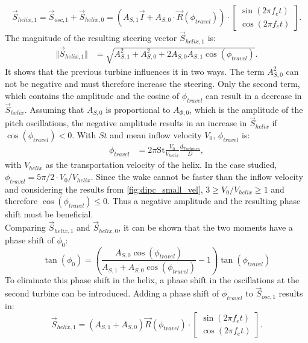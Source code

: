 \begin{equation}
	\vec{S}_{helix,1} = \vec{S}_{osc,1} + \vec{S}_{helix,0} = \left(A_{S,1} \vec{I} + A_{S,0} \cdot \vec{R}(\phi_{travel})\right) 
	\cdot 
	\begin{bmatrix}
	\sin(2\pi f_e t) \\
	\cos(2\pi f_e t)
	\end{bmatrix} .
\end{equation}
The magnitude of the resulting steering vector $\vec{S}_{helix,1}$ is:
\begin{align}
	\Vert\vec{S}_{helix,1}\Vert &= \sqrt{A_{S,1}^2 + A_{S,0}^2 + 2 A_{S,0} A_{S,1} \cos(\phi_{travel})}  \label{eq:helix_moment}.
\end{align}
It shows that the previous turbine influences it in two ways. The term $A_{S,0}^2$ can not be negative and must therefore increase the steering. Only the second term, which contains the amplitude and the cosine of $\phi_{travel}$ can result in a decrease in $\vec{S}_{helix}$. Assuming that $A_{S,0}$ is proportional to $A_{\Phi,0}$, which is the amplitude of the pitch oscillations, the negative amplitude results in an increase in $\vec{S}_{helix}$ if $\cos(\phi_{travel}) < 0$. With $St$ and mean inflow velocity $V_0$, $\phi_{travel}$ is:
\begin{align}
	\phi_{travel} & = 2 \pi \mathrm{St} \frac{V_0}{V_{helix}} \frac{d_{Turbines}}{D} \label{eq:phi_travel},
\end{align} 
with $V_{helix}$ as the transportation velocity of the helix. In the case studied, $\phi_{travel} = 5\pi/2 \cdot V_0 / V_{helix}$. Since the wake cannot be faster than the inflow velocity and considering the results from \autoref{fig:dipc_small_vel}, $ 3 \geq V_0/V_{helix} \geq 1$ and therefore $\cos(\phi_{travel})  \leq 0$. Thus a negative amplitude and the resulting phase shift must be beneficial.\\
Comparing $\vec{S}_{helix,1}$ and $\vec{S}_{helix,0}$, it can be shown that the two moments have a phase shift of $\phi_0$:
\begin{equation}
	\tan(\phi_0) = \left(\frac{A_{S,0} \cos(\phi_{travel})}{A_{S,1}+ A_{S,0} \cos(\phi_{travel})}-1\right) \tan(\phi_{travel}) \label{eq:phi_0}
\end{equation}
To eliminate this phase shift in the helix, a phase shift in the oscillations at the second turbine can be introduced. Adding a phase shift of $\phi_{travel}$ to $\vec{S}_{osc,1}$ results in:
\begin{equation}
	\vec{S}_{helix,1} = \left( A_{S,1} + A_{S,0} \right) \vec{R}(\phi_{travel}) \cdot
	\begin{bmatrix}
	\sin(2\pi f_e t) \\
	\cos(2\pi f_e t)
	\end{bmatrix} .
\end{equation}

